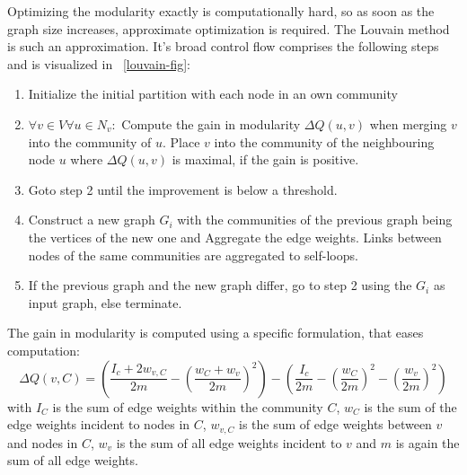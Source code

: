                 Optimizing the modularity exactly is computationally hard, so as soon as the graph size increases, approximate optimization is required.
                The Louvain method is such an approximation.
                It's broad control flow comprises the following steps and is visualized in ~\ref{louvain-fig}:
                \begin{enumerate}
                \item Initialize the initial partition with each node in an own community
                \item $\forall v \in V \forall u \in N_v:$ 
                Compute the gain in modularity $\Delta Q(u,v)$ when merging $v$ into the community of $u$. 
                Place $v$ into the community of the neighbouring node $u$ where $\Delta Q(u,v)$ is maximal, if the gain is positive.
                \item Goto step 2 until the improvement is below a threshold.
                \item Construct a new graph $G_i$ with the communities of the previous graph being the vertices of the new one and Aggregate the edge weights. 
                Links between nodes of the same communities are aggregated to self-loops.
                \item If the previous graph and the new graph differ, go to step 2 using the $G_i$ as input graph, else terminate.
                \end{enumerate}
                The gain in modularity is computed using a specific formulation, that eases computation:
                \[ 
                  \Delta Q(v, C) = \left( \frac{I_c + 2w_{v, C}}{2m} - \left( \frac{w_C + w_v}{2m} \right)^2 \right) - \left( \frac{I_c}{2m} - \left( \frac{w_C}{2m} \right)^2 - \left( \frac{w_v}{2m} \right)^2 \right)  
                \]
                with $I_C$ is the sum of edge weights within the community $C$, $w_C$ is the sum of the edge weights incident to nodes in $C$, $w_{v, C}$ is the sum of edge weights between $v$ and nodes in $C$, $w_v$ is the sum of all edge weights incident to $v$ and $m$ is again the sum of all edge weights.
                
